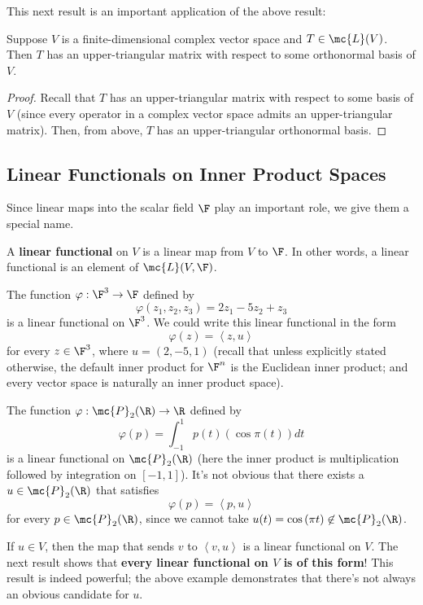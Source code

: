 \documentclass[math0540-lecture-notes.tex]{subfiles}
\begin{document}
This next result is an important application of the above result:
\begin{theorem}{}
  Suppose $V$ is a finite-dimensional complex vector space and $T\in \mc{L}(V)$. Then $T$ has an
  upper-triangular matrix with respect to some orthonormal basis of $V$.
\end{theorem}
\begin{proof}[Proof]
  Recall that $T$ has an upper-triangular matrix with respect to some basis of $V$ (since every
  operator in a complex vector space admits an upper-triangular matrix). Then, from above, $T$ has
  an upper-triangular orthonormal basis.
\end{proof}

\subsection{Linear Functionals on Inner Product Spaces}

Since linear maps into the scalar field $\F$ play an important role, we give them a special name.
\begin{definition}{}
  A \textbf{linear functional} on $V$ is a linear map from $V$ to $\F$. In other words, a linear
  functional is an element of $\mc{L}(V,\F)$.
\end{definition}
\begin{example}
  The function $\varphi:\F^3\to \F$ defined by \[
    \varphi(z_1,z_2,z_3)=2z_1-5z_2+z_3
  \] is a linear functional on $\F^3$. We could write this linear functional in the form \[
  \varphi(z)=\left<z,u \right>
\] for every $z\in \F^3$, where $u=(2,-5,1)$ (recall that unless explicitly stated otherwise, the
default inner product for $\F^n$ is the Euclidean inner product; and every vector space is naturally
an inner product space).
\end{example}

\begin{example}
  The function $\varphi:\mc{P}_2(\R)\to \R$ defined by \[
    \varphi(p)=\int_{-1}^1p(t)\left( \cos{\pi(t)} \right) dt
  \] is a linear functional on $\mc{P}_2(\R)$ (here the inner product is multiplication followed by
  integration on $[-1,1]$). It's not obvious that there exists a $u\in \mc{P}_2(\R)$ that satisfies
  \[
    \varphi(p)=\left<p,u \right>
  \] for every $p\in \mc{P}_2(\R)$, since we cannot take $u(t)=\cos{(\pi t)}\not\in \mc{P}_2(\R)$.
\end{example}

If $u\in V$, then the map that sends $v$ to $\left<v,u \right>$ is a linear functional on $V$. The
next result shows that \textbf{every linear functional on $V$ is of this form}! This result is
indeed powerful; the above example demonstrates that there's not always an obvious candidate for
$u$.
\end{document}
